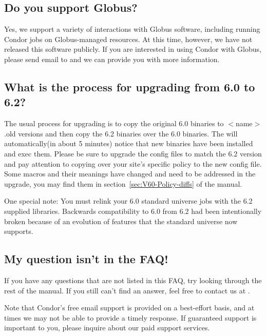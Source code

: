 
\subsection{Do you support Globus?}

Yes, we support a variety of interactions with Globus software,
including running Condor jobs on Globus-managed resources.
At this time, however, we have not released this software publicly.
If you are interested in using Condor with Globus, please send email
to  and we can provide you with more
information.


\subsection{What is the process for upgrading from 6.0 to 6.2?}

The usual process for upgrading is to copy the original 6.0 binaries
to $<$name$>$.old versions and then copy the 6.2 binaries over the 6.0
binaries. The  will automatically(in about 5 minutes)
notice that new binaries have been installed and exec them. Please be sure
to upgrade the config files to match the 6.2 version and pay attention
to copying over your site's specific policy to the new config file. Some
macros and their meanings have changed and need to be addressed in the
upgrade, you may find them in section~\ref{sec:V60-Policy-diffs} of the
manual.

One special note: You must relink your 6.0 standard universe jobs with
the 6.2 supplied libraries. Backwards compatibility to 6.0 from 6.2 had
been intentionally broken because of an evolution of features that the
standard universe now supports.

\subsection{My question isn't in the FAQ!}

If you have any questions that are not listed in this FAQ, try looking
through the rest of the manual.
If you still can't find an answer, feel free to contact us at
.

Note that Condor's free email support is provided on a best-effort
basis, and at times we may not be able to provide a timely response.
If guaranteed support is important to you, please inquire about our
paid support services.


